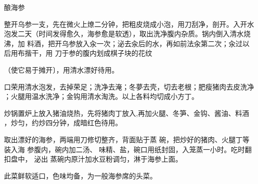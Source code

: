 \begin{recipe}[一品海参]{酿海参}

\ingredients


\cooking

\step 整开乌参一支，先在微火上燎二分钟，把粗皮烧成小泡，用刀刮净，剖开。入开水
泡发二天（时间发得愈久，海参愈是软透），取出洗净腹内杂质。锅内倒入清水烧沸，加
料酒，把开乌参放入汆一次；泌去汆后的水，再如前法汆第二次；汆过以后用布揩干，用
刀于参的腹内划成棋子块的花纹

（使它易于摊开〕，用清水漂好待用。

\step 口荣用清水泡发，去掉荣足；洗净去淹；冬夢去壳，切去老根；肥瘦猪肉去皮洗净
；火腿用温水洗净；金钩用清水淘洗。以上各料均切成小方丁。

\step 炒锅置炉上放入猪油烧热，先将猪肉丁放入,再加火腿、冬笋、金钩、酱油、料酒
，炒匀，约炒四分钟，成暗红色待用。

取出漂好的海参，两端用刀修切整齐，背面贴于蒸 碗，把炒好的猪肉、火腿丁等装入海
参腹内，碗内加二汤、 味精、盐，碗口用纸封固，入笼蒸一小时。吃时翻扣盘中， 泌出
蒸碗内原汁加水豆粉调匀，淋于海参上面。

\notes

此菜鲜软适口，色味均备，为一般海参席的头菜。

\end{recipe}

